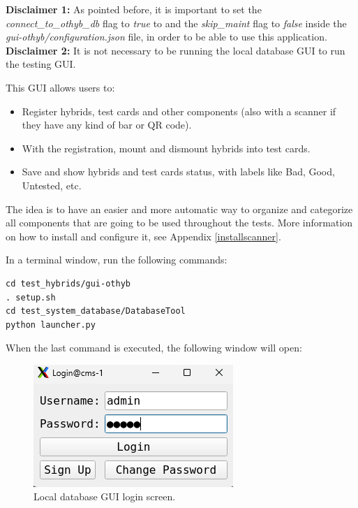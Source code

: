 \documentclass[10pt,a4paper]{article}
\begin{document}
\textbf{Disclaimer 1:} As pointed before, it is important to set the \emph{connect\_to\_othyb\_db} flag to \emph{true} to and the \emph{skip\_maint} flag to \emph{false} inside the \emph{gui-othyb/configuration.json} file, in order to be able to use this application.
\textbf{Disclaimer 2:} It is not necessary to be running the local database GUI to run the testing GUI. 

This GUI allows users to: 

\begin{itemize}
    \item Register hybrids, test cards and other components (also with a scanner if they have any kind of bar or QR code).
    \item With the registration, mount and dismount hybrids into test cards.
    \item Save and show hybrids and test cards status, with labels like Bad, Good, Untested, etc.
\end{itemize}

The idea is to have an easier and more automatic way to organize and categorize all components that are going to be used throughout the tests. More information on how to install and configure it, see Appendix \ref{installscanner}.

In a terminal window, run the following commands:

\begin{framed}
\begin{verbatim}
cd test_hybrids/gui-othyb
. setup.sh 
cd test_system_database/DatabaseTool
python launcher.py
\end{verbatim}
\end{framed}

\newpage

When the last command is executed, the following window will open:

\begin{figure}[!pbth]
\centering
 \includegraphics[width=0.5\linewidth]{Pictures/scanning-GUI-login.png} 
  \caption{Local database GUI login screen.}
  \label{oi2}
\end{figure}
\end{document}
